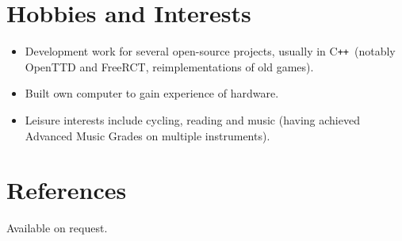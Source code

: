 \documentclass[11pt,a4paper]{article}
\newcommand{\cpp}{C{}\texttt{++}}
\begin{document}
\section*{Hobbies and Interests}
\begin{itemize}  \itemsep1pt \parskip0pt 
  \item Development work for several open-source projects, usually in
    \cpp~(notably OpenTTD and FreeRCT, reimplementations of old games).
  \item Built own computer to gain experience of hardware.  \item Leisure
    interests include cycling, reading and music (having achieved Advanced Music
    Grades on multiple instruments).
\end{itemize}

\section*{References}

Available on request.
\end{document}
